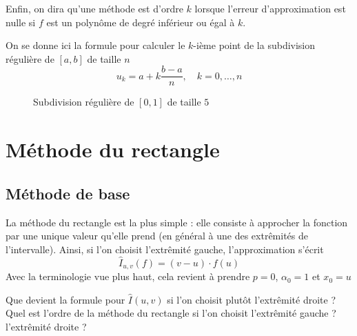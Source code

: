 Enfin, on dira qu'une méthode \textrm{est d'ordre $ k $} lorsque l'erreur d'approximation est nulle si $ f $ est un polynôme de degré inférieur ou égal à $ k $.

On se donne ici la formule pour calculer le $ k $-ième point de la subdivision régulière de $ [a, b] $ de taille $ n $ \[
    u_k = a + k\frac{b-a}{n}, \quad k=0, \ldots, n
\]

\begin{figure}[h!]
    \centering
    \caption{Subdivision régulière de $ [0, 1] $ de taille $ 5 $}
    \label{fig:subdivision-reguliere}
\end{figure}

\section{Méthode du rectangle}

\subsection{Méthode de base}
La méthode du rectangle est la plus simple : elle consiste à approcher la fonction par une unique valeur qu'elle prend (en général à une des extrêmités de l'intervalle). Ainsi, si l'on choisit l'extrêmité gauche, l'approximation s'écrit \[
    \hat{I}_{u, v}(f) = (v-u) \cdot f(u)
\]
Avec la terminologie vue plus haut, cela revient à prendre $ p=0 $, $ \alpha_0=1 $ et $ x_0=u $

\quessques Que devient la formule pour $ \hat{I}(u, v) $ si l'on choisit plutôt l'extrêmité droite ?
\ssques Quel est l'ordre de la méthode du rectangle si l'on choisit l'extrêmité gauche ? l'extrêmité droite ?

